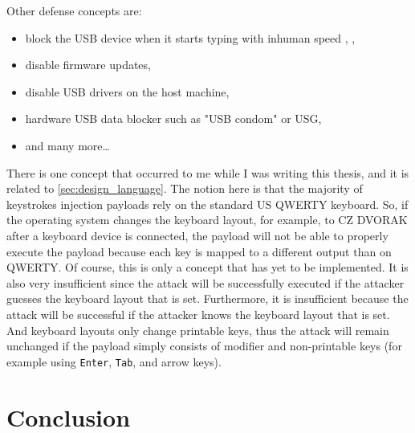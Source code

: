 Other defense concepts are:
\begin{itemize}
    \item block the USB device when it starts typing with inhuman speed \cite{KerschbaumFlorian2018UBUK}, \cite{arghire_2020},
    \item disable firmware updates,
    \item disable USB drivers on the host machine,
    \item hardware USB data blocker such as "USB condom"\cite{al-sibai_2023} or USG\cite{doctorow_2017},
    \item and many more\dots
\end{itemize}
There is one concept that occurred to me while I was writing this thesis, and it is related to \autoref{sec:design_language}. The notion here is that the majority of keystrokes injection payloads rely on the standard US QWERTY keyboard. So, if the operating system changes the keyboard layout, for example, to CZ DVORAK after a keyboard device is connected, the payload will not be able to properly execute the payload because each key is mapped to a different output than on QWERTY. Of course, this is only a concept that has yet to be implemented. It is also very insufficient since the attack will be successfully executed if the attacker guesses the keyboard layout that is set. Furthermore, it is insufficient because the attack will be successful if the attacker knows the keyboard layout that is set. And keyboard layouts only change printable keys, thus the attack will remain unchanged if the payload simply consists of modifier and non-printable keys (for example using \verb|Enter|, \verb|Tab|, and arrow keys).


\chapter{Conclusion}
\label{ch:conclusion}
